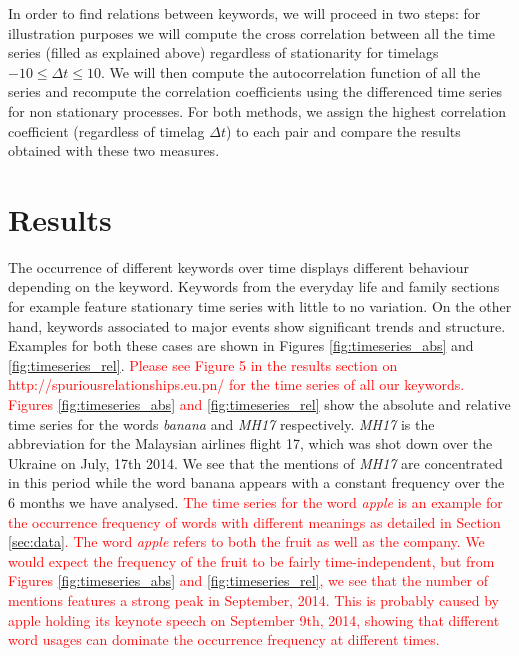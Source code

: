 \documentclass[12pt, a4paper]{article}
\begin{document}
In order to find relations between keywords, we will proceed in two steps: for illustration purposes we will compute the cross correlation between all the time series (filled as explained above) regardless of stationarity for timelags $-10 \leq \Delta t \leq 10$. We will then compute the autocorrelation function of all the series and recompute the correlation coefficients using the differenced time series for non stationary processes. For both methods, we assign the highest correlation coefficient (regardless of timelag $\Delta t$) to each pair and compare the results obtained with these two measures. 

\section{Results}
The occurrence of different keywords over time displays different behaviour depending on the keyword. Keywords from the everyday life and family sections for example feature stationary time series with little to no variation. On the other hand, keywords associated to major events show significant trends and structure. Examples for both these cases are shown in Figures \ref{fig:timeseries_abs} and \ref{fig:timeseries_rel}.  \textcolor{red}{Please see Figure 5 in the results section on http://spuriousrelationships.eu.pn/ for the time series of all our keywords. Figures \ref{fig:timeseries_abs} and \ref{fig:timeseries_rel}} show the absolute and relative time series for the words \textit{banana} and \textit{MH17} respectively. \textit{MH17} is the abbreviation for the Malaysian airlines flight 17, which was shot down over the Ukraine on July, 17th 2014. We see that the mentions of \textit{MH17} are concentrated in this period while the word banana appears with a constant frequency over the 6 months we have analysed. \textcolor{red}{The time series for the word \textit{apple} is an example for the occurrence frequency of words with different meanings as detailed in Section \ref{sec:data}. The word \textit{apple} refers to both the fruit as well as the company. We would expect the frequency of the fruit to be fairly time-independent, but from Figures \ref{fig:timeseries_abs} and \ref{fig:timeseries_rel}, we see that the number of mentions features a strong peak in September, 2014. This is probably caused by apple holding its keynote speech on September 9th, 2014, showing that different word usages can dominate the occurrence frequency at different times.}
\end{document}
